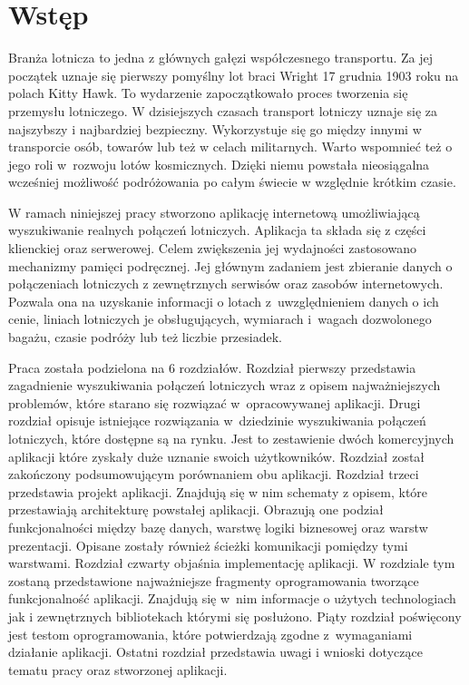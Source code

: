 \documentclass[12pt, twoside]{report}
\begin{document}
\chapter*{Wstęp}
Branża lotnicza to jedna z głównych gałęzi współczesnego transportu. Za jej początek uznaje się pierwszy pomyślny lot braci Wright 17 grudnia 1903 roku na polach Kitty Hawk. To wydarzenie zapoczątkowało proces tworzenia się przemysłu lotniczego. W dzisiejszych czasach transport lotniczy uznaje się za najszybszy i najbardziej bezpieczny. Wykorzystuje się go między innymi w transporcie osób, towarów lub też w celach militarnych. Warto wspomnieć też o jego roli w~rozwoju lotów kosmicznych. Dzięki niemu powstała nieosiągalna wcześniej możliwość podróżowania po całym świecie w względnie krótkim czasie.

W ramach niniejszej pracy stworzono aplikację internetową umożliwiającą wyszukiwanie realnych połączeń lotniczych. Aplikacja ta składa się z części klienckiej oraz serwerowej. Celem zwiększenia jej wydajności zastosowano mechanizmy pamięci podręcznej.
Jej głównym zadaniem jest zbieranie danych o połączeniach lotniczych z zewnętrznych serwisów oraz zasobów internetowych. Pozwala ona na uzyskanie informacji o lotach z~uwzględnieniem danych o ich cenie, liniach lotniczych je obsługujących, wymiarach i~wagach dozwolonego bagażu, czasie podróży lub też liczbie przesiadek.

Praca została podzielona na 6 rozdziałów. Rozdział pierwszy przedstawia zagadnienie wyszukiwania połączeń lotniczych wraz z opisem najważniejszych problemów, które starano się rozwiązać w~opracowywanej aplikacji. Drugi rozdział opisuje istniejące rozwiązania w~dziedzinie wyszukiwania połączeń lotniczych, które dostępne są na rynku. Jest to zestawienie dwóch komercyjnych aplikacji które zyskały duże uznanie swoich użytkowników. Rozdział został zakończony podsumowującym porównaniem obu aplikacji. Rozdział trzeci przedstawia projekt aplikacji. Znajdują się w nim schematy z opisem, które przestawiają architekturę powstałej aplikacji. Obrazują one podział funkcjonalności między bazę danych, warstwę logiki biznesowej oraz warstw prezentacji. Opisane zostały również ścieżki komunikacji pomiędzy tymi warstwami.
Rozdział czwarty objaśnia implementację aplikacji. W rozdziale tym zostaną przedstawione najważniejsze fragmenty oprogramowania tworzące funkcjonalność aplikacji. Znajdują się w~nim informacje o użytych technologiach jak i zewnętrznych bibliotekach którymi się posłużono. Piąty rozdział poświęcony jest testom oprogramowania, które potwierdzają zgodne z~wymaganiami działanie aplikacji. Ostatni rozdział przedstawia uwagi i wnioski dotyczące tematu pracy oraz stworzonej aplikacji.
\end{document}
